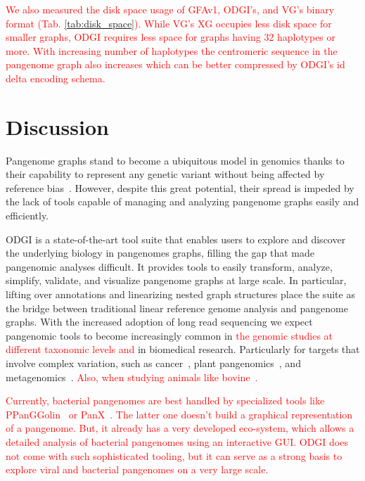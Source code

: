 \documentclass{bioinfo}
\newcommand{\REVIEWED}[1]{{\textcolor{Red}{#1}}}
\begin{document}
\REVIEWED{We also measured the disk space usage of GFAv1, ODGI's, and VG's binary format (Tab. \ref{tab:disk_space}). While VG's XG occupies less disk space for smaller graphs, ODGI requires less space for graphs having 32 haplotypes or more. With increasing number of haplotypes the centromeric sequence in the pangenome graph also increases which can be better compressed by ODGI's id delta encoding schema. }





%




\section{Discussion}
Pangenome graphs stand to become a ubiquitous model in genomics thanks to their capability to represent any genetic variant without being affected by reference bias~\citep{Eizenga_2020}.
However, despite this great potential, their spread is impeded by the lack of tools capable of managing and analyzing pangenome graphs easily and efficiently.

ODGI is a state-of-the-art tool suite that enables users to explore and discover the underlying biology in pangenomes graphs, filling the gap that made pangenomic analyses difficult.
It provides tools to easily transform, analyze, simplify, validate, and visualize pangenome graphs at large scale.
In particular, lifting over annotations and linearizing nested graph structures place the suite as the bridge between traditional linear reference genome analysis and pangenome graphs.
With the increased adoption of long read sequencing we expect pangenomic tools to become increasingly common in \REVIEWED{the genomic studies at different taxonomic levels and} in biomedical research.
Particularly for targets that involve complex variation, such as cancer\REVIEWED{~\citep{CompPan2016}}, plant pangenomics\REVIEWED{~\citep{Bayer2020, Liu2020, Qin2021, Li2022}}, and metagenomics\REVIEWED{~\citep{Zhong2021}}. \REVIEWED{Also, when studying animals like bovine~\citep{Leonard2021, Talenti2022, BPC}.}

\REVIEWED{Currently, bacterial pangenomes are best handled by specialized tools like PPanGGolin~\citep{Gautreau2020} or PanX~\citep{Wei2017}. The latter one doesn't build a graphical representation of  a pangenome. But, it already has a very developed eco-system, which allows a detailed analysis of bacterial pangenomes using an interactive GUI. ODGI does not come with such sophisticated tooling, but it can serve as a strong basis to explore viral and bacterial pangenomes on a very large scale.}
\end{document}

